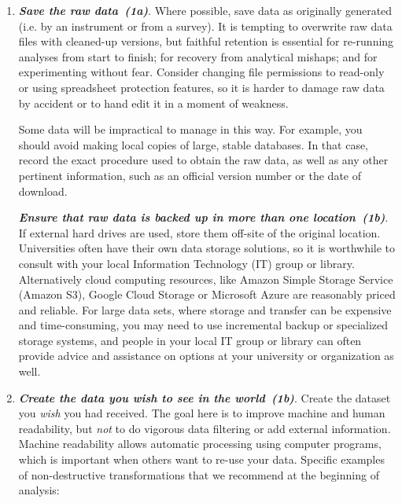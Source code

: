 \documentclass[10pt,letterpaper]{article}
\newcommand{\withurl}[2]{{#1}}
\newcommand{\practice}[2]{\textbf{\emph{{#2}~({#1})}}}
\begin{document}
\begin{enumerate}

\item

  \practice{1a}{Save the raw data}.  Where possible, save data as
  originally generated (i.e. by an instrument or from a survey).  It
  is tempting to overwrite raw data files with cleaned-up versions,
  but faithful retention is essential for re-running analyses from
  start to finish; for recovery from analytical mishaps; and for
  experimenting without fear. Consider changing file permissions to
  read-only or using spreadsheet protection features, so it is harder
  to damage raw data by accident or to hand edit it in a moment of
  weakness.

  Some data will be impractical to manage in this way. For example,
  you should avoid making local copies of large, stable databases.  In
  that case, record the exact procedure used to obtain the raw data,
  as well as any other pertinent information, such as an official
  version number or the date of download.

  \practice{1b}{Ensure that raw data is backed up in more than one
  location}. If external hard drives are used, store them off-site
  of the original location. Universities often have their own data
  storage solutions, so it is worthwhile to consult with your local
  Information Technology (IT) group or library.  Alternatively cloud
  computing resources, like  \withurl{Amazon Simple Storage Service
  (Amazon S3)}{https://aws.amazon.com/s3/},
  \withurl{Google Cloud Storage}{https://cloud.google.com/storage/}
  or \withurl{Microsoft Azure}
  {https://azure.microsoft.com/en-us/services/storage/}
  are reasonably priced and reliable.
  For large data sets, where storage and transfer can be
  expensive and time-consuming, you may need to use incremental backup
  or specialized storage systems, and people in your local IT group or
  library can often provide advice and assistance on options at your
  university or organization as well.

\item

  \practice{1b}{Create the data you wish to see in the world}. Create
  the dataset you \emph{wish} you had received.  The goal here is to
  improve machine and human readability, but \emph{not} to do vigorous
  data filtering or add external information.  Machine readability
  allows automatic processing using computer programs, which is
  important when others want to re-use your data.  Specific examples of
  non-destructive transformations that we recommend at the beginning
  of analysis:


\end{enumerate}
\end{document}
